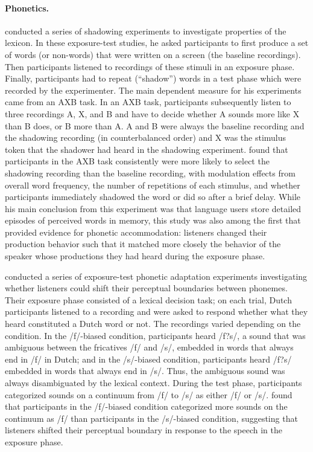 \paragraph{Phonetics.} \cite{Goldinger1998} conducted a series of shadowing experiments to investigate properties of the lexicon. In these exposure-test studies, 
he asked participants to first produce a set of words (or non-words) that were written on a screen (the baseline recordings). Then participants listened to recordings of these stimuli in 
an exposure phase. Finally, participants had to repeat (``shadow'') words in a test phase which were recorded by the experimenter. The main dependent measure
for his experiments came from an AXB task. In an AXB task, participants subsequently listen to three recordings A, X, and B and have to decide whether A sounds more like X
than B does, or B more than A. A and B were always the baseline recording and the shadowing recording (in counterbalanced order) and X was the stimulus token that the shadower had heard
in the shadowing experiment. \cite{Goldinger1998} found that participants in the AXB task consistently were more likely to select the shadowing recording than the baseline recording, with modulation
effects from overall word frequency, the number of repetitions of each stimulus, and whether participants immediately shadowed the word or did so after a brief delay. While his main conclusion
from this experiment was that language users store detailed episodes of perceived words in memory, this study was also among the first that provided evidence for phonetic accommodation: 
listeners changed their production behavior such that it matched more closely the behavior of the speaker whose productions they had heard during the exposure phase.

\cite{Norris2003} conducted a series of exposure-test phonetic adaptation
experiments investigating whether listeners could shift their perceptual boundaries between phonemes. Their exposure phase
consisted of a lexical decision task; on each trial, Dutch participants listened to a recording and were asked to respond whether
what they heard constituted a Dutch word or not. The recordings varied depending on the condition. In the /f/-biased condition,
participants heard /f?s/, a sound that was ambiguous between the fricatives /f/ and /s/, embedded in words that always end in /f/
in Dutch; and in the /s/-biased condition, participants heard /f?s/ embedded in words that always end in /s/. Thus, the ambiguous sound was always 
disambiguated by the lexical context. During the test phase, participants categorized sounds on a continuum from /f/ to /s/ as either /f/ or /s/. \cite{Norris2003}
found that participants in the /f/-biased condition categorized more sounds on the continuum as /f/ than participants in the /s/-biased condition,
suggesting that listeners shifted their perceptual boundary in response to the speech in the exposure phase.
 
